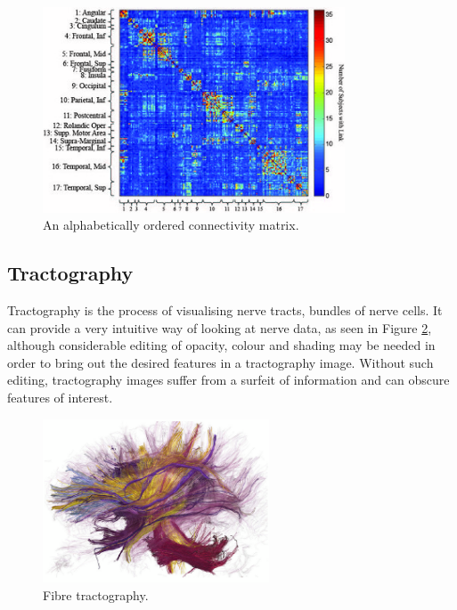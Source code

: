 \documentclass[MSc,paper=a4,pagesize=auto]{icldt}
\begin{document}
\begin{figure}[htbp!]
    \centering
    \includegraphics[width=0.8\textwidth]{resources/connectivity_matrix}
    \caption{An alphabetically ordered connectivity matrix. \cite{Wang2011}}
    \label{fig:connectivity_matrix}
\end{figure}

\clearpage
\subsection{Tractography}
Tractography is the process of visualising nerve tracts, bundles of nerve cells. It can provide a very intuitive way of looking at nerve data, as seen in Figure \ref{fig:tractography}, although considerable editing of opacity, colour and shading may be needed in order to bring out the desired features in a tractography image. Without such editing, tractography images suffer from a surfeit of information and can obscure features of interest.

\begin{figure}[htbp!]
    \centering
    \includegraphics[width=0.6\textwidth]{resources/tractography}
    \caption{Fibre tractography. \cite{Odonnell2006}}
    \label{fig:tractography}
\end{figure}
\end{document}
